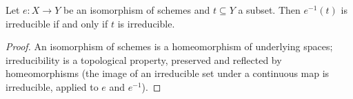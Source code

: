 \begin{lemma}
  \label{pa-lem:irreducible_transport}
  \leanok

  Let \(e : X \to Y\) be an isomorphism of schemes and \(t \subseteq Y\) a
  subset. Then \(e^{-1}(t)\) is irreducible if and only if \(t\) is
  irreducible.
\end{lemma}
\begin{proof}
  \leanok
  An isomorphism of schemes is a homeomorphism of underlying spaces;
  irreducibility is a topological property, preserved and reflected by
  homeomorphisms (the image of an irreducible set under a continuous map is
  irreducible, applied to \(e\) and \(e^{-1}\)).
\end{proof}

